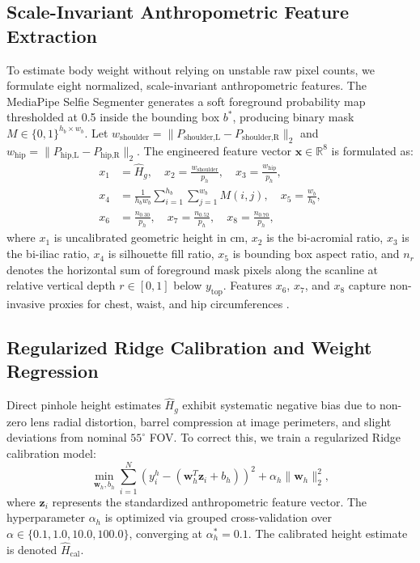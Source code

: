 \documentclass[conference]{IEEEtran}
\begin{document}
\subsection{Scale-Invariant Anthropometric Feature Extraction}
To estimate body weight without relying on unstable raw pixel counts, we formulate eight normalized, scale-invariant anthropometric features. The MediaPipe Selfie Segmenter generates a soft foreground probability map thresholded at 0.5 inside the bounding box $b^*$, producing binary mask $M \in \{0, 1\}^{h_b \times w_b}$. Let $w_{\text{shoulder}} = \|P_{\text{shoulder,L}} - P_{\text{shoulder,R}}\|_2$ and $w_{\text{hip}} = \|P_{\text{hip,L}} - P_{\text{hip,R}}\|_2$. The engineered feature vector $\mathbf{x} \in \mathbb{R}^8$ is formulated as:
\begin{align}
x_1 &= \widehat{H}_g, \quad
x_2 = \frac{w_{\text{shoulder}}}{p_h}, \quad
x_3 = \frac{w_{\text{hip}}}{p_h}, \label{eq:feat1} \\
x_4 &= \frac{1}{h_b w_b} \sum_{i=1}^{h_b} \sum_{j=1}^{w_b} M(i,j), \quad
x_5 = \frac{w_b}{h_b}, \label{eq:feat2} \\
x_6 &= \frac{n_{0.30}}{p_h}, \quad
x_7 = \frac{n_{0.52}}{p_h}, \quad
x_8 = \frac{n_{0.70}}{p_h}, \label{eq:feat3}
\end{align}
where $x_1$ is uncalibrated geometric height in cm, $x_2$ is the bi-acromial ratio, $x_3$ is the bi-iliac ratio, $x_4$ is silhouette fill ratio, $x_5$ is bounding box aspect ratio, and $n_r$ denotes the horizontal sum of foreground mask pixels along the scanline at relative vertical depth $r \in [0, 1]$ below $y_{\text{top}}$. Features $x_6$, $x_7$, and $x_8$ capture non-invasive proxies for chest, waist, and hip circumferences \cite{rativa2018}.

\subsection{Regularized Ridge Calibration and Weight Regression}
Direct pinhole height estimates $\widehat{H}_g$ exhibit systematic negative bias due to non-zero lens radial distortion, barrel compression at image perimeters, and slight deviations from nominal $55^\circ$ FOV. To correct this, we train a regularized Ridge calibration model:
\begin{equation}
\min_{\mathbf{w}_h, b_h} \sum_{i=1}^{N} \left( y_i^h - (\mathbf{w}_h^T \mathbf{z}_i + b_h) \right)^2 + \alpha_h \|\mathbf{w}_h\|_2^2,
\end{equation}
where $\mathbf{z}_i$ represents the standardized anthropometric feature vector. The hyperparameter $\alpha_h$ is optimized via grouped cross-validation over $\alpha \in \{0.1, 1.0, 10.0, 100.0\}$, converging at $\alpha_h^* = 0.1$. The calibrated height estimate is denoted $\widehat{H}_{\text{cal}}$.
\end{document}
